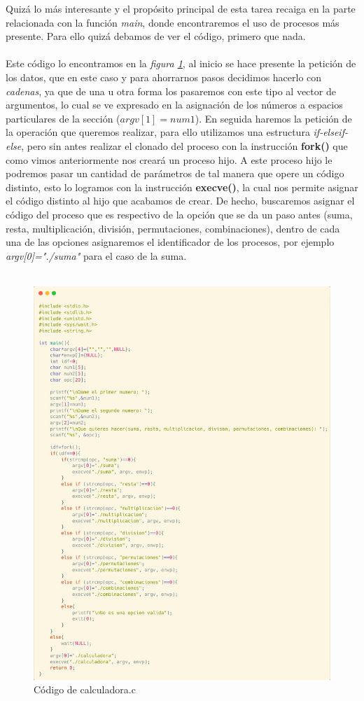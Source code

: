 \documentclass[10pt]{article}
\begin{document}
	\newpage
	Quizá lo más interesante y el propósito principal de esta tarea recaiga en la parte relacionada con la función \emph{main}, donde encontraremos el uso de procesos más presente. Para ello quizá debamos de ver el código, primero que nada. 
	\\\\
	Este código lo encontramos en la \emph{figura \ref{fig:calculadora}}, al inicio se hace presente la petición de los datos, que en este caso y para ahorrarnos pasos decidimos hacerlo con \emph{cadenas}, ya que de una u otra forma los pasaremos con este tipo al vector de argumentos, lo cual se ve expresado en la asignación de los números a espacios particulares de la sección ($argv[1]=num1$). En seguida haremos la petición de la operación que queremos realizar, para ello utilizamos una estructura \emph{if-elseif-else}, pero sin antes realizar el clonado del proceso con la instrucción \textbf{fork()} que como vimos anteriormente nos creará un proceso hijo.
	\newpage
	A este proceso hijo le podremos pasar un cantidad de parámetros de tal manera que opere un código distinto, esto lo logramos con la instrucción \textbf{execve()}, la cual nos permite asignar el código distinto al hijo que acabamos de crear. De hecho, buscaremos asignar el código del proceso que es respectivo de la opción que se da un paso antes (suma, resta, multiplicación, división, permutaciones, combinaciones), dentro de cada una de las opciones asignaremos el identificador de los procesos, por ejemplo \emph{argv[0]="./suma"} para el caso de la suma. 
	\\\\
	\begin{figure}[h!]
		\centering
		\includegraphics[width=0.7\linewidth]{calculadora.png}
		\caption{Código de calculadora.c}
		\label{fig:calculadora}
	\end{figure}
\end{document}
